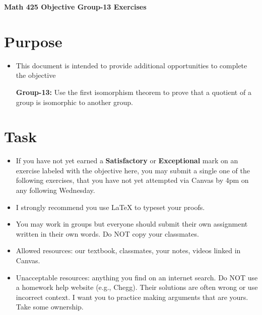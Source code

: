 \documentclass[12pt]{article}
\begin{document}
	\begin{center}
		{\Large \bf Math 425 Objective Group-13 Exercises}
	\end{center}
	\section*{Purpose}
	\begin{itemize}
		\item This document is intended to provide additional opportunities to complete the objective
		
		\textbf{Group-13:}  Use the first isomorphism theorem to prove that a quotient of a group is isomorphic to another group.
	\end{itemize}
	\section*{Task}
	\begin{itemize}
		\item If you have not yet earned a \textbf{Satisfactory} or \textbf{Exceptional} mark on an exercise labeled with the objective here, you may submit a single one of the following exercises, that you have not yet attempted via Canvas by 4pm on any following Wednesday.
		\item I strongly recommend you use LaTeX to typeset your proofs.
		\item You may work in groups but everyone should submit their own assignment written in their own words.  Do NOT copy your classmates.
		\item Allowed resources: our textbook, classmates, your notes, videos linked in Canvas.
		\item Unacceptable resources: anything you find on an internet search. Do NOT use a homework help website (e.g., Chegg). Their solutions are often wrong or use incorrect context.  I want you to practice making arguments that are yours. Take some ownership.
	\end{itemize}
\end{document}

